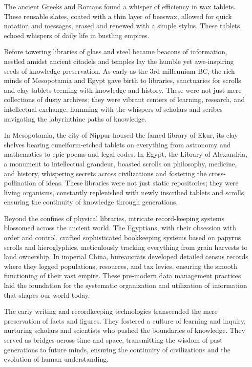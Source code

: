 \documentclass[
  letterpaper,
  DIV=11,
  numbers=noendperiod]{scrreprt}
\begin{document}
The ancient Greeks and Romans found a whisper of efficiency in wax
tablets. These reusable slates, coated with a thin layer of beeswax,
allowed for quick notation and messages, erased and renewed with a
simple stylus. These tablets echoed whispers of daily life in bustling
empires.

Before towering libraries of glass and steel became beacons of
information, nestled amidst ancient citadels and temples lay the humble
yet awe-inspiring seeds of knowledge preservation. As early as the 3rd
millennium BC, the rich minds of Mesopotamia and Egypt gave birth to
libraries, sanctuaries for scrolls and clay tablets teeming with
knowledge and history. These were not just mere collections of dusty
archives; they were vibrant centers of learning, research, and
intellectual exchange, humming with the whispers of scholars and scribes
navigating the labyrinthine paths of knowledge.

In Mesopotamia, the city of Nippur housed the famed library of Ekur, its
clay shelves bearing cuneiform-etched tablets on everything from
astronomy and mathematics to epic poems and legal codes. In Egypt, the
Library of Alexandria, a monument to intellectual grandeur, boasted
scrolls on philosophy, medicine, and history, whispering secrets across
civilizations and fostering the cross-pollination of ideas. These
libraries were not just static repositories; they were living organisms,
constantly replenished with newly inscribed tablets and scrolls,
ensuring the continuity of knowledge through generations.

Beyond the confines of physical libraries, intricate record-keeping
systems blossomed across the ancient world. The Egyptians, with their
obsession with order and control, crafted sophisticated bookkeeping
systems based on papyrus scrolls and hieroglyphics, meticulously
tracking everything from grain harvests to land ownership. In imperial
China, bureaucrats developed detailed census records where they logged
populations, resources, and tax levies, ensuring the smooth functioning
of their vast empire. These pre-modern data management practices laid
the foundation for the systematic organization and utilization of
information that shapes our world today.

The early writing and recordkeeping technologies transcended the mere
preservation of facts and figures. They fostered a culture of learning
and inquiry, nurturing scholars and scientists who pushed the boundaries
of knowledge. They served as bridges across time and space, transmitting
the wisdom of past generations to future minds, ensuring the continuity
of civilizations and the evolution of human understanding.
\end{document}
